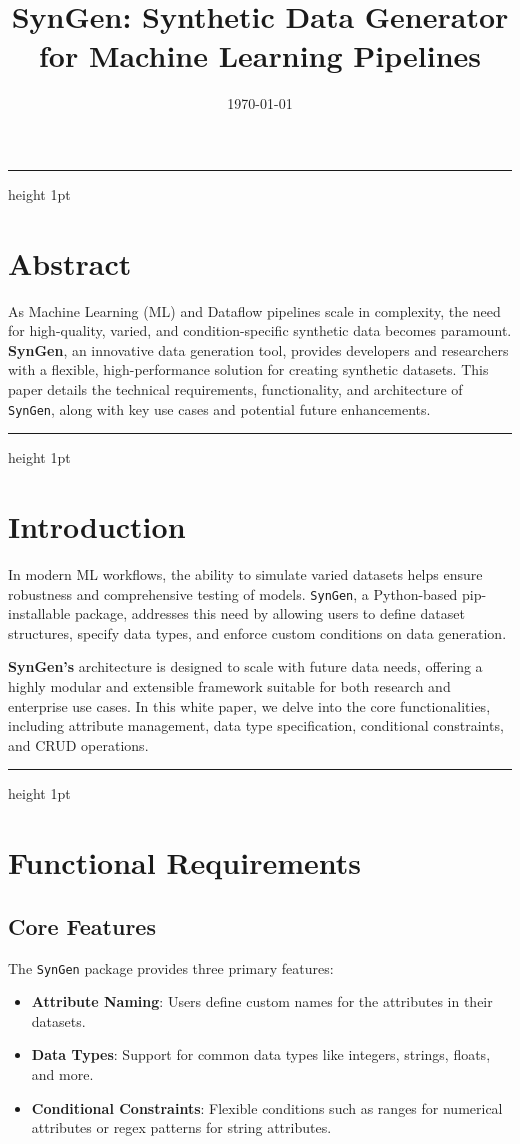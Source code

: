 \documentclass{article}
\title{\Huge \textbf{SynGen: Synthetic Data Generator for Machine Learning Pipelines}}
\author{}
\date{\today}
\newcommand{\horizbar}{
    \vspace{1em}
    \hrule height 1pt
    \vspace{1em}
}
\begin{document}
    \maketitle
    \horizbar

    \section*{Abstract}
    As Machine Learning (ML) and Dataflow pipelines scale in complexity, the need for high-quality, varied, and condition-specific synthetic data becomes paramount. \textbf{SynGen}, an innovative data generation tool, provides developers and researchers with a flexible, high-performance solution for creating synthetic datasets. This paper details the technical requirements, functionality, and architecture of \texttt{SynGen}, along with key use cases and potential future enhancements.

    \horizbar


    \section{Introduction}
    In modern ML workflows, the ability to simulate varied datasets helps ensure robustness and comprehensive testing of models. \texttt{SynGen}, a Python-based pip-installable package, addresses this need by allowing users to define dataset structures, specify data types, and enforce custom conditions on data generation.

    \textbf{SynGen's} architecture is designed to scale with future data needs, offering a highly modular and extensible framework suitable for both research and enterprise use cases. In this white paper, we delve into the core functionalities, including attribute management, data type specification, conditional constraints, and CRUD operations.

    \horizbar


    \section{Functional Requirements}

    \subsection{Core Features}
    The \texttt{SynGen} package provides three primary features:
    \begin{itemize}
        \item \textbf{Attribute Naming}: Users define custom names for the attributes in their datasets.
        \item \textbf{Data Types}: Support for common data types like integers, strings, floats, and more.
        \item \textbf{Conditional Constraints}: Flexible conditions such as ranges for numerical attributes or regex patterns for string attributes.
    \end{itemize}
\end{document}
